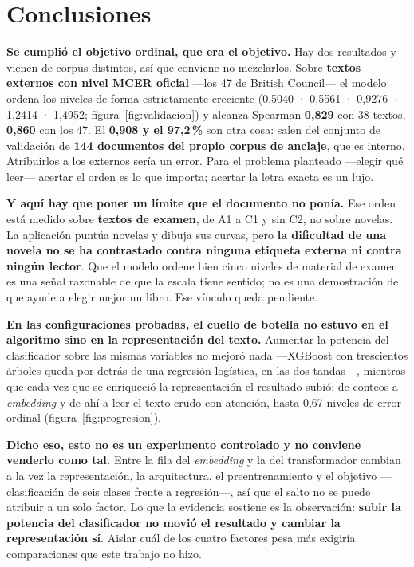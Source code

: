 \documentclass[11pt,a4paper]{article}
\newcommand{\pct}{\,\%}
\begin{document}
\section{Conclusiones}

\textbf{Se cumplió el objetivo ordinal, que era el objetivo.} Hay dos resultados y vienen
de corpus distintos, así que conviene no mezclarlos. Sobre
\textbf{textos externos con nivel MCER oficial} —los 47 de British Council— el modelo
ordena los niveles de forma estrictamente creciente (0,5040 · 0,5561 · 0,9276 · 1,2414 ·
1,4952; figura~\ref{fig:validacion}) y alcanza Spearman \textbf{0,829} con 38 textos,
\textbf{0,860} con los 47. El \textbf{0,908 y el 97,2\pct} son otra cosa: salen del
conjunto de validación de \textbf{144 documentos del propio corpus de anclaje}, que es
interno. Atribuirlos a los externos sería un error. Para el problema planteado —elegir qué leer— acertar el orden
es lo que importa; acertar la letra exacta es un lujo.

\textbf{Y aquí hay que poner un límite que el documento no ponía.} Ese orden está medido
sobre \textbf{textos de examen}, de A1 a C1 y sin C2, no sobre novelas. La aplicación
puntúa novelas y dibuja sus curvas, pero \textbf{la dificultad de una novela no se ha
contrastado contra ninguna etiqueta externa ni contra ningún lector}. Que el modelo ordene
bien cinco niveles de material de examen es una señal razonable de que la escala tiene
sentido; no es una demostración de que ayude a elegir mejor un libro. Ese vínculo queda
pendiente.

\textbf{En las configuraciones probadas, el cuello de botella no estuvo en el algoritmo
sino en la representación del texto.} Aumentar la potencia del clasificador sobre las
mismas variables no mejoró nada —XGBoost con trescientos árboles queda por detrás de una
regresión logística, en las dos tandas—, mientras que cada vez que se enriqueció la
representación el resultado subió: de conteos a \emph{embedding} y de ahí a leer el texto
crudo con atención, hasta 0,67 niveles de error ordinal (figura~\ref{fig:progresion}).

\textbf{Dicho eso, esto no es un experimento controlado y no conviene venderlo como tal.}
Entre la fila del \emph{embedding} y la del transformador cambian a la vez la
representación, la arquitectura, el preentrenamiento y el objetivo —clasificación de seis
clases frente a regresión—, así que el salto no se puede atribuir a un solo factor. Lo que
la evidencia sostiene es la observación: \textbf{subir la potencia del clasificador no
movió el resultado y cambiar la representación sí}. Aislar cuál de los cuatro factores
pesa más exigiría comparaciones que este trabajo no hizo.
\end{document}
